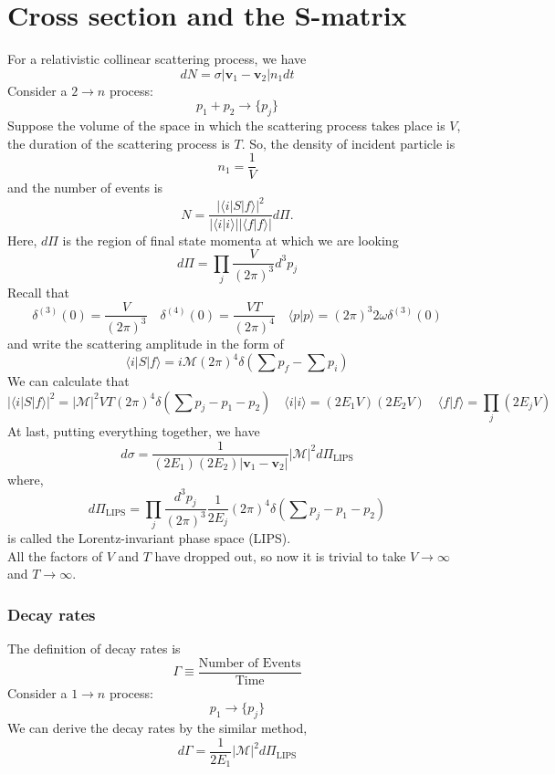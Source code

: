 \documentclass[cyan]{elegantnote}
\begin{document}
\section{Cross section and the S-matrix}
\noindent
For a relativistic collinear scattering process, we have
\[dN = \sigma |\bm{v}_1 - \bm{v}_2| n_1 dt\]
Consider a  $2 \to n$ process:
\[p_1 + p_2 \to \{p_j\}\]
Suppose the volume of the space in which the scattering process takes place is $V$, the duration of the scattering process is $T$. 
So, the density of incident particle is
\[n_1 = \frac{1}{V}\]
and the number of events is
\[N = \frac{|\langle i | S | f \rangle|^2}{|\langle i | i \rangle||\langle f | f \rangle|} d\Pi .\]
Here, $d\Pi$ is the region of final state momenta at which we are looking
\[d\Pi = \prod_j \frac{V}{(2\pi)^3} d^3 p_j\]
Recall that
\[\delta^{(3)}(0) = \frac{V}{(2\pi)^3} \quad \delta^{(4)}(0) = \frac{VT}{(2\pi)^4} \quad \langle p | p \rangle = (2\pi)^3 2\omega \delta^{(3)}(0)\]
and write the scattering amplitude in the form of
\[\langle i | S | f \rangle = i\mathcal{M}(2\pi)^4\delta(\sum p_f-\sum p_i)\]
We can calculate that
\[|\langle i | S | f \rangle|^2 = |\mathcal{M}|^2 VT (2\pi)^4 \delta(\sum p_j - p_1 - p_2) \quad \langle i | i \rangle = (2E_1V) (2E_2V) \quad \langle f | f \rangle = \prod_j (2E_jV)\]
At last, putting everything together, we have
\[d\sigma = \frac{1}{(2E_1)(2E_2)|\bm{v}_1-\bm{v}_2|} |\mathcal{M}|^2 d\Pi_{\mathrm{LIPS}}\]
where,
\[d\Pi_{\mathrm{LIPS}} = \prod_j \frac{d^3p_j}{(2\pi)^3} \frac{1}{2E_j} (2\pi)^4 \delta(\sum p_j - p_1 - p_2)\]
is called the Lorentz-invariant phase space (LIPS). \\
All the factors of $V$ and $T$ have dropped out, so now it is trivial to take $V \to \infty$ and $T \to \infty$. 

\subsubsection{Decay rates}
\noindent
The definition of decay rates is
\[\Gamma \equiv \frac{\mbox{Number of Events}}{\mbox{Time}}\]
Consider a  $1 \to n$ process:
\[p_1 \to \{p_j\}\]
We can derive the decay rates by the similar method,
\[d\Gamma = \frac{1}{2E_1} |\mathcal{M}|^2 d\Pi_{\mathrm{LIPS}} \]
\end{document}
